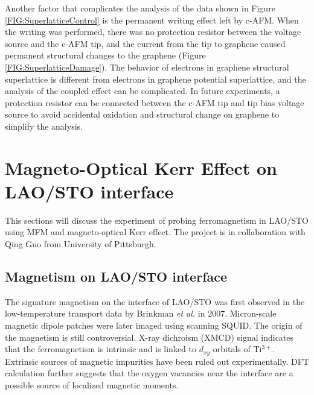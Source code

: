 \documentclass[pdflatex, sectionletters, 12pt]{pittetd}    %
\begin{document}
Another factor that complicates the analysis of the data shown in Figure \ref{FIG:SuperlatticeControl} is the permanent writing effect left by c-AFM. When the writing was performed, there was no protection resistor between the voltage source and the c-AFM tip, and the current from the tip to graphene caused permanent structural changes to the graphene (Figure \ref{FIG:SuperlatticeDamage}). The behavior of electrons in graphene structural superlattice\cite{jessen2019lithographic} is different from electrons in graphene potential superlattice, and the analysis of the coupled effect can be complicated. In future experiments, a protection resistor can be connected between the c-AFM tip and tip bias voltage source to avoid accidental oxidation and structural change on graphene to simplify the analysis.

\chapter{Magneto-Optical Kerr Effect on LAO/STO interface}
\label{SEC:Kerr}

This sections will discuss the experiment of probing ferromagnetism in LAO/STO using MFM and magneto-optical Kerr effect. The project is in collaboration with Qing Guo from University of Pittsburgh.

\section{Magnetism on LAO/STO interface}

The signature magnetism on the interface of LAO/STO was first observed in the low-temperature transport data by Brinkman \textit{et al.} in 2007\cite{brinkman2007magnetic}. Micron-scale magnetic dipole patches were later imaged using scanning SQUID\cite{bert2011direct, kalisky2012scanning, kalisky2012critical}. The origin of the magnetism is still controversial. X-ray dichroism (XMCD) signal indicates that the ferromagnetism is intrinsic and is linked to $d_{xy}$ orbitals of Ti$^{3+}$\cite{lee2013titanium}. Extrinsic sources of magnetic impurities have been ruled out experimentally\cite{brinkman2007magnetic, lee2013titanium, ariando2011electronic}. DFT calculation further suggests that the oxygen vacancies near the interface are a possible source of localized magnetic moments\cite{pentcheva2006charge}. 
\end{document}
